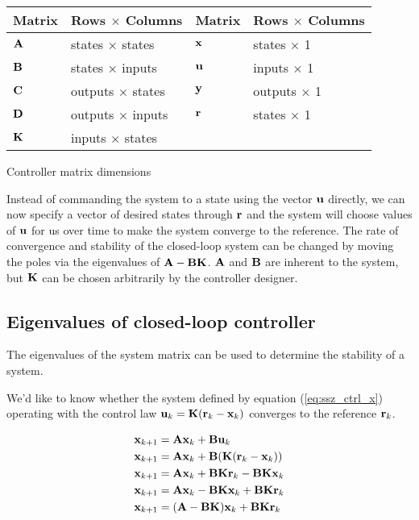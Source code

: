 \begin{booktable}
  \begin{tabular}{|ll|ll|}
    \hline
    \rowcolor{headingbg}
    \textbf{Matrix} & \textbf{Rows $\times$ Columns} &
    \textbf{Matrix} & \textbf{Rows $\times$ Columns} \\
    \hline
    $\mathbf{A}$ & states $\times$ states & $\mathbf{x}$ & states $\times$ 1 \\
    $\mathbf{B}$ & states $\times$ inputs & $\mathbf{u}$ & inputs $\times$ 1 \\
    $\mathbf{C}$ & outputs $\times$ states & $\mathbf{y}$ & outputs $\times$ 1 \\
    $\mathbf{D}$ & outputs $\times$ inputs & $\mathbf{r}$ & states $\times$ 1 \\
    $\mathbf{K}$ & inputs $\times$ states &  &  \\
    \hline
  \end{tabular}
  \caption{Controller matrix dimensions}
  \label{tab:ctrl_matrix_dims}
\end{booktable}

Instead of commanding the system to a state using the vector $\mathbf{u}$ directly,
we can now specify a vector of desired states through $\mathbf{r}$ and the system
will choose values of $\mathbf{u}$ for us over time to make the system converge to
the reference. The rate of convergence and stability of the closed-loop system
can be changed by moving the poles via the eigenvalues of $\mathbf{A} -
\mathbf{B}\mathbf{K}$. $\mathbf{A}$ and $\mathbf{B}$ are inherent to the system, but
$\mathbf{K}$ can be chosen arbitrarily by the controller designer.

\subsection{Eigenvalues of closed-loop controller}

The eigenvalues of the system matrix can be used to determine the stability of a
\gls{system}.

We'd like to know whether the \gls{system} defined by equation
(\ref{eq:ssz_ctrl_x}) operating with the \gls{control law}
$\mathbf{u}_k = \mathbf{K}(\mathbf{r}_k - \mathbf{x}_k)$ converges to the \gls{reference}
$\mathbf{r}_k$.

\begin{align}
  \mathbf{x}_{k+1} &= \mathbf{A}\mathbf{x}_k + \mathbf{B}\mathbf{u}_k \nonumber \\
  \mathbf{x}_{k+1} &= \mathbf{A}\mathbf{x}_k + \mathbf{B}(\mathbf{K}(\mathbf{r}_k - \mathbf{x}_k))
    \nonumber \\
  \mathbf{x}_{k+1} &= \mathbf{A}\mathbf{x}_k + \mathbf{B}\mathbf{K}\mathbf{r}_k -
    \mathbf{B}\mathbf{K}\mathbf{x}_k \nonumber \\
  \mathbf{x}_{k+1} &= \mathbf{A}\mathbf{x}_k - \mathbf{B}\mathbf{K}\mathbf{x}_k +
    \mathbf{B}\mathbf{K}\mathbf{r}_k \nonumber \\
  \mathbf{x}_{k+1} &= (\mathbf{A} - \mathbf{B}\mathbf{K})\mathbf{x}_k +
    \mathbf{B}\mathbf{K}\mathbf{r}_k \label{eq:ctrl_eig_calc}
\end{align}

